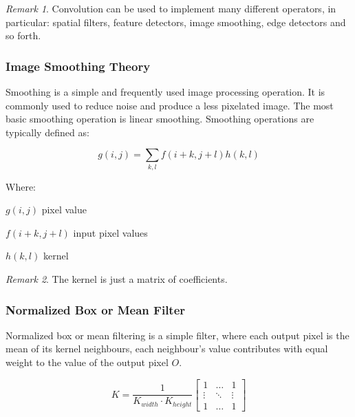 \documentclass{article}
\theoremstyle{definition}
\theoremstyle{remark}
\newtheorem*{rem}{Remark}
\begin{document}
\begin{rem}
    Convolution can be used to implement many different operators, in particular: spatial filters, feature detectors, image smoothing, edge detectors and so forth.
\end{rem}

\subsubsection{Image Smoothing Theory}

Smoothing is a simple and frequently used image processing operation. It is commonly used to reduce noise and produce a less pixelated image. The most basic smoothing operation is linear smoothing. Smoothing operations are typically defined as:


\begin{equation}
    g(i, j) = \sum_{k, l} f(i + k, j + l) h(k, l)
\end{equation}

\noindent Where:\\
\begin{description}
    \item $ g(i, j) $ pixel value\\
    \item $ f(i + k,j + l) $ input pixel values\\
    \item $ h(k, l) $ kernel\\
\end{description}

\begin{rem}
The kernel is just a matrix of coefficients.
\end{rem}

\subsubsection{Normalized Box or Mean Filter}

Normalized box or mean filtering is a simple filter, where each output pixel is the mean of its kernel neighbours, each neighbour's value contributes with equal weight to the value of the output pixel $ O $.

\begin{equation}
    K = \frac{1}{K_{width} \cdot K_{height}}
    \begin{bmatrix}
	1 & \dots & 1 \\
	\vdots & \ddots & \vdots \\ 
	1 & \dots & 1
    \end{bmatrix}
\end{equation}
\end{document}
